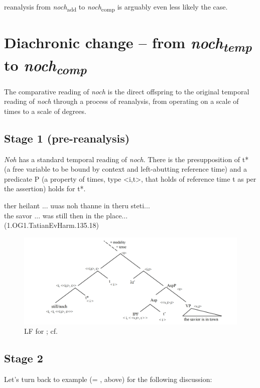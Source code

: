 \documentclass[output=paper,
modfonts
]{langscibook}
\begin{document}
reanalysis from \textit{noch}\textsubscript{add} to \textit{noch}\textsubscript{comp} is arguably even less likely the case.



\section{Diachronic change -- from \textit{noch\textsubscript{temp}} to \textit{noch\textsubscript{comp}}}\label{sec_diachr_analysis}

The comparative reading of \textit{noch} is the direct offspring to the original temporal reading of \textit{noch} through a process of reanalysis, from operating on a scale of times to a scale of degrees.

\subsection{Stage 1 (pre-reanalysis)} \textit{Noh} has a standard temporal reading of \textit{noch}. There is the presupposition of t* (a free variable to be bound by context and left-abutting reference time) and a predicate P (a property of times, type <i,t>, that holds of reference time t as per the assertion) holds for t*.

\ea\gll ther heilant ... uuas noh thanne in theru steti...\\
       the savor ... was still then in the place...\\
(1.OG1.TatianEvHarm.135.18)\label{TEMP_jesus_noch_in_town}
\z

\begin{figure}
\includegraphics[width=1\textwidth]{figures/LF0_temp}
\caption{LF for ; cf. \citep{beck2016a_sub}}
\label{fig:LF_TEMP_jesus_noch_in_town}
\end{figure}

\subsection{Stage 2} Let's turn back to example  (= , above) for the following discussion:
\end{document}
